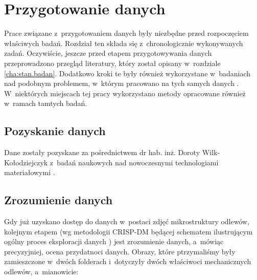 \chapter{Przygotowanie danych}
\label{cha:przyg.danych}

Prace związane z~przygotowaniem danych były niezbędne przed rozpoczęciem właściwych badań. Rozdział ten składa się z~chronologicznie wykonywanych zadań. Oczywiście, jeszcze przed etapem przygotowywania danych przeprowadzono przegląd literatury, który został opisany w~rozdziale \ref{cha:stan.badan}. Dodatkowo kroki te były również wykorzystane w~badaniach nad podobnym problemem, w~którym pracowano na tych samych danych \cite{Reczek21}. W~niektórych miejscach tej pracy wykorzystano metody opracowane również w~ramach tamtych badań.

\section{Pozyskanie danych}
\label{sec:pozyskanie_danych}

Dane zostały pozyskane za pośrednictwem dr hab. inż. Doroty Wilk-Kołodziejczyk z~badań naukowych nad nowoczesnymi technologiami materiałowymi \cite{Pirowski17, specodlew}.

\section{Zrozumienie danych}
\label{sec:zrozumienie_danych}

Gdy już uzyskano dostęp do danych w~postaci zdjęć mikrostruktury odlewów, kolejnym etapem (wg metodologii CRISP-DM będącej schematem ilustrującym ogólny proces eksploracji danych \cite{Watson00}) jest zrozumienie danych, a~mówiąc precyzyjniej, ocena przydatnoci danych. 
Obrazy, które ptrzymaliśmy były zamieszczone w~dwóch folderach i~dotyczyły dwóch właściwoci mechanicznych odlewów, a~mianowicie:

